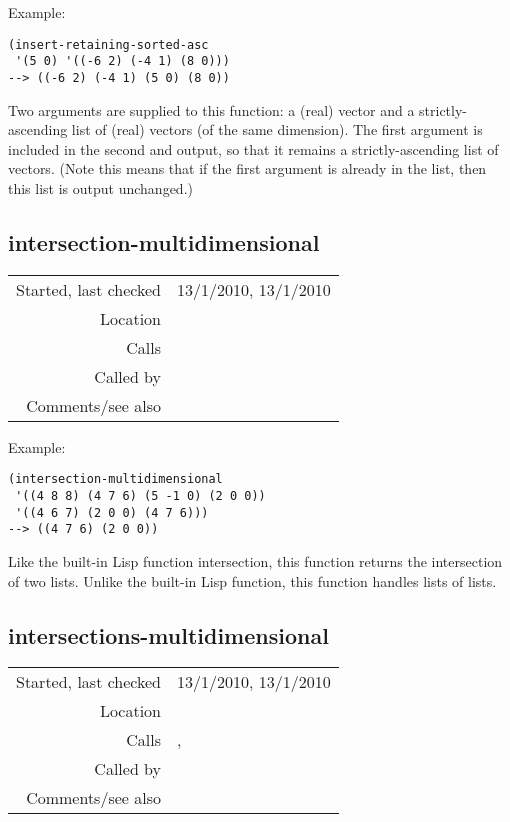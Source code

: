 \vspace{0.5cm}
\noindent Example:
\begin{verbatim}
(insert-retaining-sorted-asc
 '(5 0) '((-6 2) (-4 1) (8 0)))
--> ((-6 2) (-4 1) (5 0) (8 0))
\end{verbatim}

\noindent Two arguments are supplied to this function:
a (real) vector and a strictly-ascending list of
(real) vectors (of the same dimension). The first 
argument is included in the second and output, so that
it remains a strictly-ascending list of vectors. (Note
this means that if the first argument is already in
the list, then this list is output unchanged.)


\subsection*{intersection-multidimensional}\label{fun:intersection-multidimensional}

\vspace{0.3cm}
\begin{tabular}{r|p{8cm}}
Started, last checked & 13/1/2010, 13/1/2010 \\
Location & \nameref{sec:set-operations} \\
Calls & \nameref{fun:test-equal<list-elements} \\
Called by & \nameref{fun:intersections-multidimensional} \\
Comments/see also & 
\end{tabular}

\vspace{0.5cm}
\noindent Example:
\begin{verbatim}
(intersection-multidimensional
 '((4 8 8) (4 7 6) (5 -1 0) (2 0 0))
 '((4 6 7) (2 0 0) (4 7 6)))
--> ((4 7 6) (2 0 0))
\end{verbatim}

\noindent Like the built-in Lisp function
intersection, this function returns the intersection
of two lists. Unlike the built-in Lisp function, this
function handles lists of lists.


\subsection*{intersections-multidimensional}\label{fun:intersections-multidimensional}

\vspace{0.3cm}
\begin{tabular}{r|p{8cm}}
Started, last checked & 13/1/2010, 13/1/2010 \\
Location & \nameref{sec:set-operations} \\
Calls & \nameref{fun:intersection-multidimensional},\newline \nameref{fun:null-list-of-lists} \\
Called by & \\
Comments/see also & 
\end{tabular}

